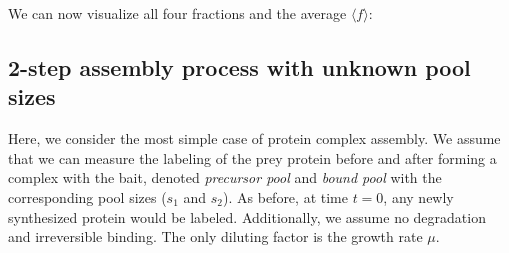\documentclass{article}
\newcommand{\fin}{\ensuremath{\langle f \rangle}}
\begin{document}
We can now visualize all four fractions and the average $\fin$:
\begin{center}
\end{center}

\subsection{2-step assembly process with unknown pool sizes}
Here, we consider the most simple case of protein complex assembly. We assume that we can measure the labeling of the prey protein before and after forming a complex with the bait, denoted \textit{precursor pool} and \textit{bound pool} with the corresponding pool sizes ($s_1$ and $s_2$). As before, at time $t = 0$, any newly synthesized protein would be labeled. Additionally, we assume no degradation and irreversible binding. The only diluting factor is the growth rate $\mu$.
\end{document}
